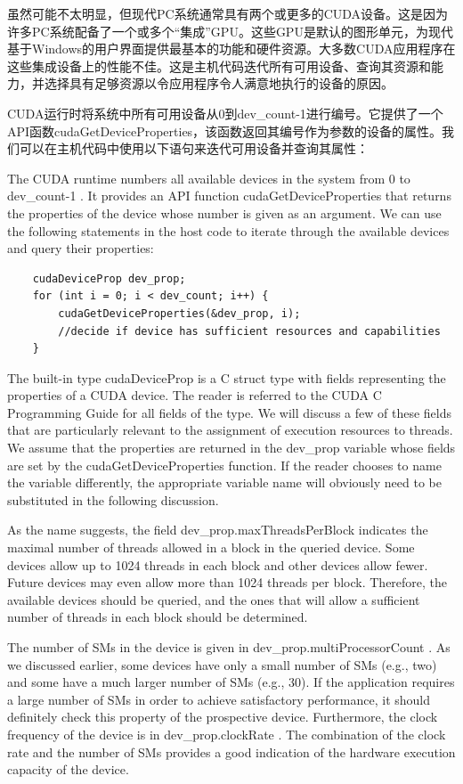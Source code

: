 \documentclass[11pt]{ctexart}
\begin{document}
虽然可能不太明显，但现代PC系统通常具有两个或更多的CUDA设备。这是因为许多PC系统配备了一个或多个“集成”GPU。这些GPU是默认的图形单元，为现代基于Windows的用户界面提供最基本的功能和硬件资源。大多数CUDA应用程序在这些集成设备上的性能不佳。这是主机代码迭代所有可用设备、查询其资源和能力，并选择具有足够资源以令应用程序令人满意地执行的设备的原因。

CUDA运行时将系统中所有可用设备从0到dev\_count-1进行编号。它提供了一个API函数cudaGetDeviceProperties，该函数返回其编号作为参数的设备的属性。我们可以在主机代码中使用以下语句来迭代可用设备并查询其属性：

The CUDA runtime numbers all available devices in the system from 0 to
dev\_count-1 . It provides an API function cudaGetDeviceProperties that returns the properties of the device whose number is given as an argument. We can use the following statements in the host code to iterate through the available devices and query their properties:

\begin{lstlisting}
	cudaDeviceProp dev_prop;
	for (int i = 0; i < dev_count; i++) {
		cudaGetDeviceProperties(&dev_prop, i);
		//decide if device has sufficient resources and capabilities
	}
\end{lstlisting}

The built-in type cudaDeviceProp is a C struct type with fields representing the properties of a CUDA device. The reader is referred to the CUDA C Programming Guide for all fields of the type. We will discuss a few of these fields that are particularly relevant to the assignment of execution resources to threads. We assume that the properties are returned in the dev\_prop variable whose fields are set by the cudaGetDeviceProperties function. If the reader chooses to name the variable differently,
the appropriate variable name will obviously need to be substituted in the following discussion.

As the name suggests, the field dev\_prop.maxThreadsPerBlock indicates the maximal number of threads allowed in a block in the queried device. Some devices allow up to 1024 threads in each block and other devices allow fewer. Future devices may even allow more than 1024 threads per block. Therefore, the available devices should be queried, and the ones that will allow a sufficient number of threads in each block should be determined. 

The number of SMs in the device is given in dev\_prop.multiProcessorCount . As we discussed earlier, some devices have only a small number of SMs (e.g., two) and some have a much larger number of SMs (e.g., 30). If the application requires a large number of SMs in order to achieve satisfactory performance, it should definitely
check this property of the prospective device. Furthermore, the clock frequency of the device is in dev\_prop.clockRate . The combination of the clock rate and the number of SMs provides a good indication of the hardware execution capacity of the device.
\end{document}
